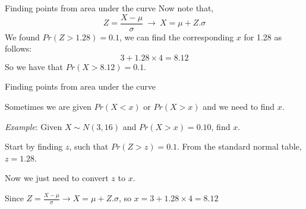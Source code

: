 \documentclass{./../div_teaching_slides}
\begin{document}
\begin{frame}{Finding points from area under the curve}
Now note that, 
$$Z = \frac{X-\mu}{\sigma} \ \rightarrow \ X = \mu + Z.\sigma$$
We found $Pr(Z>1.28)=0.1$, we can find the corresponding $x$ for 1.28 as follows:
$$ 3+1.28 \times 4 = 8.12 $$
So we have that $Pr(X > 8.12) = 0.1$.
\end{frame}



\begin{frame}{Finding points from area under the curve}
\begin{witemize}
  \item Sometimes we are given $ Pr(X<x)$ or $Pr(X>x)$ and we need to find $x$. 
  \item \textit{Example}: Given $X \sim N(3, 16)$ and $ Pr(X>x) = 0.10$, find $x$. 
  \item Start by finding $z$, such that $Pr(Z>z)=0.1$. From the standard normal table, $z=1.28$.
  \item Now we just need to convert $z$ to $x$.
  \item Since $Z = \frac{X-\mu}{\sigma} \rightarrow X = \mu + Z.\sigma$, so $x = 3+1.28 \times 4 = 8.12$
\end{witemize}
\end{frame}
\end{document}
